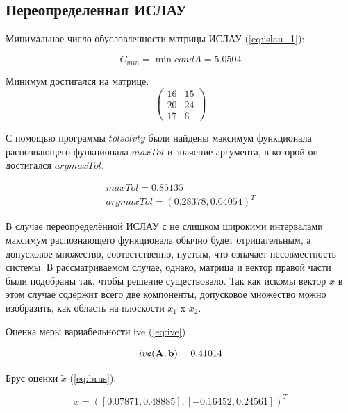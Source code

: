 \documentclass[12pt,a4paper]{scrartcl}
\begin{document}
\subsection{Переопределенная ИСЛАУ}

Минимальное число обусловленности матрицы ИСЛАУ (\ref{eq:islau_1}):

\begin{equation}
	C_{min} = \min{condA} = 5.0504
\end{equation}

Минимум достигался на матрице:
\begin{equation}
	\left(
	\begin{array}{cc}
	16 & 15 \\
    	20 & 24 \\
    	17 & 6
	\end{array}
	\right)
\end{equation}

С помощью программы $tolsolvty$ были найдены максимум функционала распознающего функционала $max Tol$ и значение аргумента, в которой он достигался $arg max Tol$.

\begin{equation}
	\begin{array}{c}
	maxTol = 0.85135 \\
	argmaxTol = (0.28378, 0.04054)^T
	\end{array}
\end{equation}

В случае переопределённой ИСЛАУ с не слишком широкими интервалами максимум распознающего функционала обычно будет отрицательным, а допусковое множество, соответственно, пустым, что означает несовместность системы. В рассматриваемом случае, однако, матрица и вектор правой части были подобраны так, чтобы решение существовало. Так как искомы вектор $x$ в этом случае содержит всего две компоненты, допусковое множество можно изобразить, как область на плоскости $x_1$ x $x_2$.

Оценка меры вариабельности ive (\ref{eq:ive})

\begin{equation}
	ive(\bold{A}; \bold{b}) = 0.41014
\end{equation}

Брус оценки $\tilde x$ (\ref{eq:brus}):

\begin{equation}
	\tilde x = ([0.07871, 0.48885], [-0.16452, 0.24561])^T
\end{equation}
\end{document}
